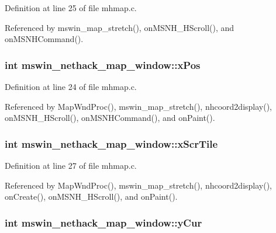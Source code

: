 Definition at line 25 of file mhmap.\+c.



Referenced by mswin\+\_\+map\+\_\+stretch(), on\+M\+S\+N\+H\+\_\+\+H\+Scroll(), and on\+M\+S\+N\+H\+Command().

\hypertarget{structmswin__nethack__map__window_a194bde5da5a3744d473a63513c8f0e54}{
\subsubsection[{x\+Pos}]{\setlength{\rightskip}{0pt plus 5cm}int mswin\+\_\+nethack\+\_\+map\+\_\+window\+::x\+Pos}}\label{structmswin__nethack__map__window_a194bde5da5a3744d473a63513c8f0e54}


Definition at line 24 of file mhmap.\+c.



Referenced by Map\+Wnd\+Proc(), mswin\+\_\+map\+\_\+stretch(), nhcoord2display(), on\+M\+S\+N\+H\+\_\+\+H\+Scroll(), on\+M\+S\+N\+H\+Command(), and on\+Paint().

\hypertarget{structmswin__nethack__map__window_a7fdb5eaa836b646caa95fa6b813111f6}{
\subsubsection[{x\+Scr\+Tile}]{\setlength{\rightskip}{0pt plus 5cm}int mswin\+\_\+nethack\+\_\+map\+\_\+window\+::x\+Scr\+Tile}}\label{structmswin__nethack__map__window_a7fdb5eaa836b646caa95fa6b813111f6}


Definition at line 27 of file mhmap.\+c.



Referenced by Map\+Wnd\+Proc(), mswin\+\_\+map\+\_\+stretch(), nhcoord2display(), on\+Create(), on\+M\+S\+N\+H\+\_\+\+H\+Scroll(), and on\+Paint().

\hypertarget{structmswin__nethack__map__window_a6d0d676450acedb201f08b279667818a}{
\subsubsection[{y\+Cur}]{\setlength{\rightskip}{0pt plus 5cm}int mswin\+\_\+nethack\+\_\+map\+\_\+window\+::y\+Cur}}\label{structmswin__nethack__map__window_a6d0d676450acedb201f08b279667818a}


